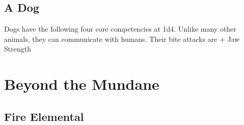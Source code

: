 \subsection*{A Dog}
Dogs have the following four core competencies at 1d4.
Unlike many other animals, they can communicate with humans.
Their bite attacks are  + Jaw Strength\\


\section*{Beyond the Mundane}

\subsection*{Fire Elemental}
\label{subsec:fire_elemental}
